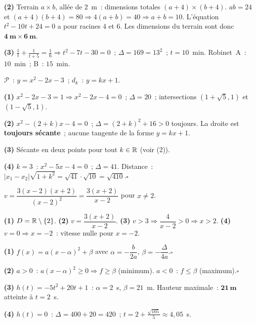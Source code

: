 \textbf{(2)} Terrain $a\times b$, all\'ee de $2$~m~: dimensions totales $(a+4)\times(b+4)$.
$ab=24$ et $(a+4)(b+4)=80\Rightarrow4(a+b)=40\Rightarrow a+b=10$.
L'\'equation $t^2-10t+24=0$ a pour racines $4$ et $6$.
Les dimensions du terrain sont donc $\mathbf{4\ \text{m}\times6\ \text{m}}$.

\textbf{(3)} $\frac{1}{t}+\frac{1}{t+5}=\frac{1}{6}\Rightarrow t^2-7t-30=0$~;
$\Delta=169=13^2$~; $t=10$~min. Robinet~A~: $10$~min~; B~: $15$~min.


$\mathcal{P}$~: $y=x^2-2x-3$~; $d_k$~: $y=kx+1$.

\textbf{(1)} $x^2-2x-3=1\Rightarrow x^2-2x-4=0$~; $\Delta=20$~;
intersections $(1+\sqrt{5},1)$ et $(1-\sqrt{5},1)$.

\textbf{(2)} $x^2-(2+k)x-4=0$~; $\Delta=(2+k)^2+16>0$ toujours.
La droite est \textbf{toujours s\'ecante}~; aucune tangente de la forme $y=kx+1$.

\textbf{(3)} S\'ecante en deux points pour tout $k\in\mathbb{R}$ (voir (2)).

\textbf{(4)} $k=3$~: $x^2-5x-4=0$~; $\Delta=41$.
Distance~: $|x_1-x_2|\sqrt{1+k^2}=\sqrt{41}\cdot\sqrt{10}=\sqrt{410}$.\hfill$\square$


$v=\dfrac{3(x-2)(x+2)}{(x-2)^2}=\dfrac{3(x+2)}{x-2}$ pour $x\ne2$.

\textbf{(1)} $D=\mathbb{R}\setminus\{2\}$.
\textbf{(2)} $v=\dfrac{3(x+2)}{x-2}$.
\textbf{(3)} $v>3\Rightarrow\dfrac{4}{x-2}>0\Rightarrow x>2$.
\textbf{(4)} $v=0\Rightarrow x=-2$~: vitesse nulle pour $x=-2$.


\textbf{(1)} $f(x)=a(x-\alpha)^2+\beta$ avec $\alpha=-\dfrac{b}{2a}$, $\beta=-\dfrac{\Delta}{4a}$.\hfill$\square$

\textbf{(2)} $a>0$~: $a(x-\alpha)^2\geq0\Rightarrow f\geq\beta$ (minimum).
$a<0$~: $f\leq\beta$ (maximum).\hfill$\square$

\textbf{(3)} $h(t)=-5t^2+20t+1$~: $\alpha=2$~s, $\beta=21$~m.
Hauteur maximale~: $\mathbf{21\,\text{m}}$ atteinte \`a $t=2$~s.

\textbf{(4)} $h(t)=0$~: $\Delta=400+20=420$~;
$t=2+\tfrac{\sqrt{105}}{5}\approx4{,}05$~s.

